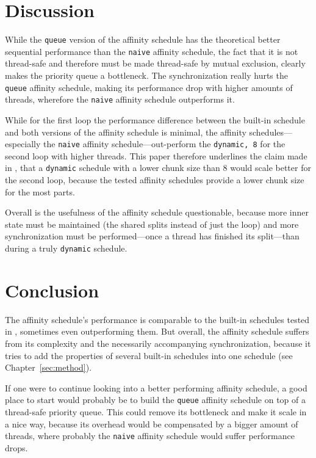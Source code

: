 \documentclass[twoside,11pt]{article}
\begin{document}

\section{Discussion} %

While the \texttt{queue} version of the affinity schedule
has the theoretical better sequential performance than the
\texttt{naive} affinity schedule, the fact that it is not
thread-safe and therefore must be made thread-safe by
mutual exclusion, clearly makes the priority queue a
bottleneck.
The synchronization really hurts the \texttt{queue}
affinity schedule, making its performance drop with higher
amounts of threads, wherefore the \texttt{naive} affinity
schedule outperforms it.

While for the first loop the performance difference between
the built-in schedule and both versions of the affinity
schedule is minimal, the affinity schedules---especially
the \texttt{naive} affinity schedule---out-perform the
\texttt{dynamic, 8} for the second loop with higher
threads.
This paper therefore underlines the claim made in
\citep{b1}, that a \texttt{dynamic} schedule with a lower
chunk size than 8 would scale better for the second loop,
because the tested affinity schedules provide a lower
chunk size for the most parts.

Overall is the usefulness of the affinity schedule
questionable, because more inner state must be maintained
(the shared splits instead of just the loop) and more
synchronization must be performed---once a thread has
finished its split---than during a truly \texttt{dynamic}
schedule.


\section{Conclusion} %

The affinity schedule's performance is comparable to the
built-in schedules tested in \citet{b1}, sometimes even
outperforming them.
But overall, the affinity schedule suffers from its
complexity and the necessarily accompanying
synchronization, because it tries to add the properties
of several built-in schedules into one schedule (see
Chapter~\ref{sec:method}).

If one were to continue looking into a better performing
affinity schedule, a good place to start would probably be
to build the \texttt{queue} affinity schedule on top of a
thread-safe priority queue.
This could remove its bottleneck and make it scale in a
nice way, because its overhead would be compensated by
a bigger amount of threads, where probably the
\texttt{naive} affinity schedule would suffer performance
drops.
%



\end{document}
